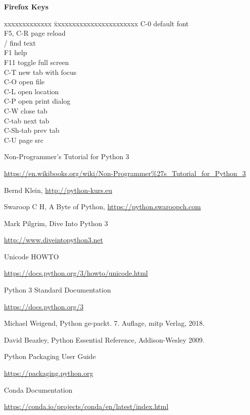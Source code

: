 \documentclass[9pt,a4wide]{extarticle}
\begin{document}
{\bf Firefox Keys}
{}

\begin{tabbing}
    xxxxxxxxxxxxx \= xxxxxxxxxxxxxxxxxxxxxxx \kill
    C-0           \> default font   \\
    F5, C-R       \> page reload  \\
    /             \> find text  \\
    F1            \> help   \\
    F11           \> toggle full screen  \\
    C-T           \> new tab with focus  \\
    C-O           \> open file  \\
    C-L           \> open location  \\
    C-P           \> open print dialog   \\
    C-W           \> close tab  \\
    C-tab         \> next tab  \\
    C-Sh-tab      \> prev tab  \\
    C-U           \> page src  \\
\end{tabbing}
    




\begin{thebibliography}{zzzz}

 Non-Programmer's Tutorial for Python 3

   \url{https://en.wikibooks.org/wiki/Non-Programmer%27s_Tutorial_for_Python_3}

 Bernd Klein, \url{http://python-kurs.eu}

 Swaroop C H, A Byte of Python, \url{https://python.swaroopch.com}

 Mark Pilgrim, Dive Into Python 3

    \url{http://www.diveintopython3.net}

 Unicode HOWTO

    \url{https://docs.python.org/3/howto/unicode.html}

 Python 3 Standard Documentation

    \url{https://docs.python.org/3}

 Michael Weigend, Python ge-packt. 7. Auflage, mitp Verlag, 2018.

 David Beazley, Python Essential Reference, Addison-Wesley 2009.

 Python Packaging User Guide

    \url{https://packaging.python.org}

 Conda Documentation

    \url{https://conda.io/projects/conda/en/latest/index.html}

\end{thebibliography}
\end{document}
